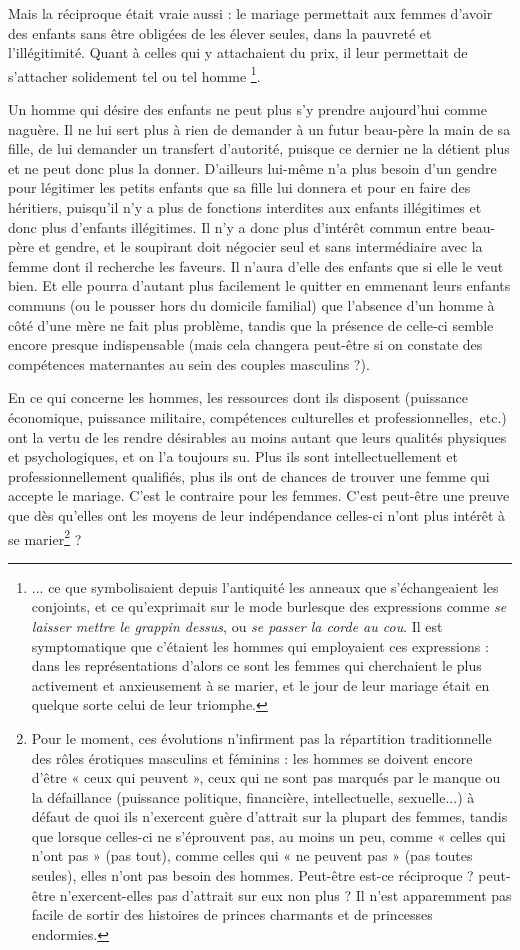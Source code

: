  Mais la réciproque était vraie aussi : le mariage permettait aux femmes d'avoir des enfants sans être obligées de les élever seules, dans la pauvreté et l'illégitimité. Quant à celles qui y attachaient du prix, il leur permettait de s'attacher solidement tel ou tel homme
\footnote{... ce que symbolisaient depuis l'antiquité les anneaux que s'échangeaient les conjoints, et ce qu'exprimait sur le mode burlesque des expressions comme {\emph{se laisser mettre le grappin dessus}}, ou {\emph{se passer la corde au cou}}. Il est symptomatique que c'étaient les hommes qui employaient ces expressions : dans les représentations d'alors ce sont les femmes qui cherchaient le plus activement et anxieusement à se marier, et le jour de leur mariage était en quelque sorte celui de leur triomphe.}.
 
 Un homme qui désire des enfants ne peut plus s'y prendre aujourd'hui comme naguère. Il ne lui sert plus à rien de demander à un futur beau-père la main de sa fille, de lui demander un transfert d'autorité, puisque ce dernier ne la détient plus et ne peut donc plus la donner. D'ailleurs lui-même n'a plus besoin d'un gendre pour légitimer les petits enfants que sa fille lui donnera et pour en faire des héritiers, puisqu'il n'y a plus de fonctions interdites aux enfants illégitimes et donc plus d'enfants illégitimes. Il n'y a donc plus d'intérêt commun entre beau-père et gendre, et le soupirant doit négocier seul et sans intermédiaire avec la femme dont il recherche les faveurs. Il n'aura d'elle des enfants que si elle le veut bien. Et elle pourra d'autant plus facilement le quitter en emmenant leurs enfants communs (ou le pousser hors du domicile familial) que l'absence d'un homme à côté d'une mère ne fait plus problème, tandis que la présence de celle-ci semble encore presque indispensable (mais cela changera peut-être si on constate des compétences maternantes au sein des couples masculins ?). 
 
 En ce qui concerne les hommes, les ressources dont ils disposent (puissance économique, puissance militaire, compétences culturelles et professionnelles,~etc.) ont la vertu de les rendre désirables au moins autant que leurs qualités physiques et psychologiques, et on l'a toujours su. Plus ils sont intellectuellement et professionnellement qualifiés, plus ils ont de chances de trouver une femme qui accepte le mariage. C'est le contraire pour les femmes. C'est peut-être une preuve que dès qu'elles ont les moyens de leur indépendance celles-ci n'ont plus intérêt à se marier\footnote{Pour le moment, ces évolutions n'infirment pas la répartition traditionnelle des rôles érotiques masculins et féminins : les hommes se doivent encore d'être « ceux qui peuvent », ceux qui ne sont pas marqués par le manque ou la défaillance (puissance politique, financière, intellectuelle, sexuelle...) à défaut de quoi ils n'exercent guère d'attrait sur la plupart des femmes, tandis que lorsque celles-ci ne s'éprouvent pas, au moins un peu, comme « celles qui n'ont pas » (pas tout), comme celles qui « ne peuvent pas » (pas toutes seules), elles n'ont pas besoin des hommes. Peut-être est-ce réciproque ? peut-être n'exercent-elles pas d'attrait sur eux non plus ? Il n'est apparemment pas facile de sortir des histoires de princes charmants et de princesses endormies.} ? 
 
